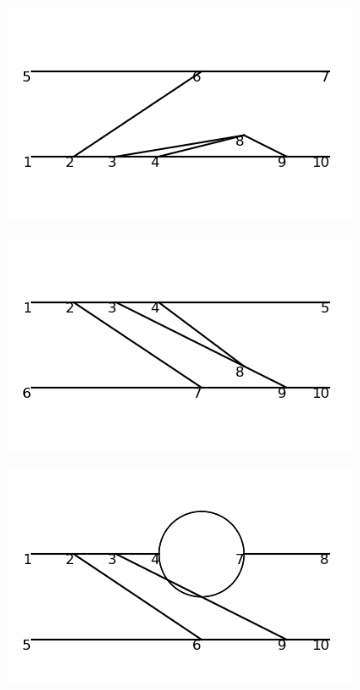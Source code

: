 \documentclass[11pt,a4paper,twoside,pdf]{article}
\numberwithin{equation}{section}
\begin{document}
\begin{figure}[h!]
\begin{subfigure}[t]{0.16\textwidth}
    \end{subfigure}
    \hfill
    \begin{subfigure}[t]{0.16\textwidth}
        \centering
        \includegraphics[width=\textwidth]{plots/order6_2to2/57.png}
    \end{subfigure}
    \hfill
    \begin{subfigure}[t]{0.16\textwidth}
        \centering
        \includegraphics[width=\textwidth]{plots/order6_2to2/58.png}
    \end{subfigure}
    \hfill
    \begin{subfigure}[t]{0.16\textwidth}
        \centering
        \includegraphics[width=\textwidth]{plots/order6_2to2/59.png}

\end{subfigure}
\end{figure}
\end{document}
